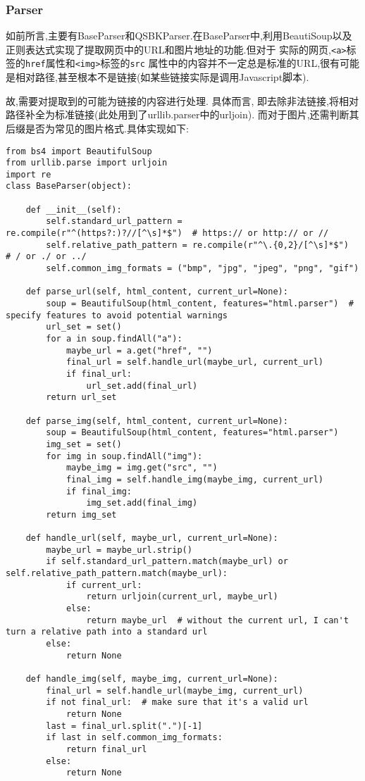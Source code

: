 \documentclass[a4paper]{article}
\begin{document}
            \subsubsection{Parser}
如前所言,主要有BaseParser和QSBKParser.在BaseParser中,利用BeautiSoup以及正则表达式实现了提取网页中的URL和图片地址的功能.但对于
实际的网页,\texttt{<a>}标签的\texttt{href}属性和\texttt{<img>}标签的\texttt{src}
属性中的内容并不一定总是标准的URL,很有可能是相对路径,甚至根本不是链接(如某些链接实际是调用Javascript脚本). 

故,需要对提取到的可能为链接的内容进行处理. 具体而言, 即去除非法链接,将相对路径补全为标准链接(此处用到了urllib.parser中的urljoin).
而对于图片,还需判断其后缀是否为常见的图片格式.具体实现如下:

\begin{verbatim}
from bs4 import BeautifulSoup
from urllib.parse import urljoin
import re
class BaseParser(object):

    def __init__(self):
        self.standard_url_pattern = re.compile(r"^(https?:)?//[^\s]*$")  # https:// or http:// or //
        self.relative_path_pattern = re.compile(r"^\.{0,2}/[^\s]*$")  # / or ./ or ../
        self.common_img_formats = ("bmp", "jpg", "jpeg", "png", "gif")

    def parse_url(self, html_content, current_url=None):
        soup = BeautifulSoup(html_content, features="html.parser")  # specify features to avoid potential warnings
        url_set = set()
        for a in soup.findAll("a"):
            maybe_url = a.get("href", "")
            final_url = self.handle_url(maybe_url, current_url)
            if final_url:
                url_set.add(final_url)
        return url_set

    def parse_img(self, html_content, current_url=None):
        soup = BeautifulSoup(html_content, features="html.parser")
        img_set = set()
        for img in soup.findAll("img"):
            maybe_img = img.get("src", "")
            final_img = self.handle_img(maybe_img, current_url)
            if final_img:
                img_set.add(final_img)
        return img_set

    def handle_url(self, maybe_url, current_url=None):
        maybe_url = maybe_url.strip()
        if self.standard_url_pattern.match(maybe_url) or self.relative_path_pattern.match(maybe_url):
            if current_url:
                return urljoin(current_url, maybe_url)
            else:
                return maybe_url  # without the current url, I can't turn a relative path into a standard url
        else:
            return None

    def handle_img(self, maybe_img, current_url=None):
        final_url = self.handle_url(maybe_img, current_url)
        if not final_url:  # make sure that it's a valid url
            return None
        last = final_url.split(".")[-1]
        if last in self.common_img_formats:
            return final_url
        else:
            return None
\end{verbatim}
\end{document}
